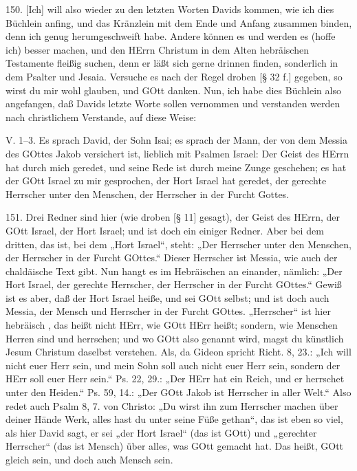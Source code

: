 150. [Ich] will also wieder zu den letzten Worten Davids kommen, wie ich dies Büchlein anfing, und das Kränzlein mit dem Ende und Anfang zusammen binden, denn ich genug herumgeschweift habe. Andere können es und werden es (hoffe ich) besser machen, und den HErrn Christum in dem Alten hebräischen Testamente fleißig suchen, denn er läßt sich gerne drinnen finden, sonderlich in dem Psalter und Jesaia. Versuche es nach der Regel droben [§ 32 f.] gegeben, so wirst du mir wohl glauben, und GOtt danken. Nun, ich habe dies Büchlein also angefangen, daß Davids letzte Worte sollen vernommen und verstanden werden nach christlichem Verstande, auf diese Weise:

\begin{schriftzitat}
V. 1–3. Es sprach David, der Sohn Isai; es sprach der Mann, der von dem Messia des GOttes Jakob versichert ist, lieblich mit Psalmen Israel: Der Geist des HErrn hat durch mich geredet, und seine Rede ist durch meine Zunge geschehen; es hat der GOtt Israel zu mir gesprochen, der Hort Israel hat geredet, der gerechte Herrscher unter den Menschen, der Herrscher in der Furcht Gottes.
\end{schriftzitat}

151. Drei Redner sind hier (wie droben [§ 11] gesagt), der Geist des HErrn, der GOtt Israel, der Hort Israel; und ist doch ein einiger Redner. Aber bei dem dritten, das ist, bei dem „Hort Israel“, steht: „Der Herrscher unter den Menschen, der Herrscher in der Furcht GOttes.“ Dieser Herrscher ist Messia, wie auch der chaldäische Text gibt. Nun hangt es im Hebräischen an einander, nämlich: „Der Hort Israel, der gerechte Herrscher, der Herrscher in der Furcht GOttes.“ Gewiß ist es aber, daß  der Hort Israel heiße, und sei GOtt selbst; und ist doch auch Messia, der Mensch und Herrscher in der Furcht GOttes. „Herrscher“ ist hier hebräisch , das heißt nicht HErr, wie GOtt HErr
heißt; sondern, wie Menschen Herren sind und herrschen; und wo GOtt also genannt wird, magst du künstlich Jesum Christum daselbst verstehen. Als, da Gideon spricht Richt. 8, 23.: „Ich will nicht euer Herr sein, und mein Sohn soll auch nicht euer Herr sein, sondern der HErr soll euer Herr sein.“ Ps. 22, 29.: „Der HErr hat ein Reich, und er herrschet unter den Heiden.“ Ps. 59, 14.: „Der GOtt Jakob ist Herrscher in aller Welt.“ Also redet auch Psalm 8, 7. von Christo: „Du wirst ihn zum Herrscher machen über deiner Hände Werk, alles hast du unter seine Füße gethan“, das ist eben so viel, als hier David sagt, er sei „der Hort Israel“ (das ist GOtt) und „gerechter Herrscher“ (das ist Mensch) über alles, was GOtt gemacht hat. Das heißt, GOtt gleich sein, und doch auch Mensch sein.

